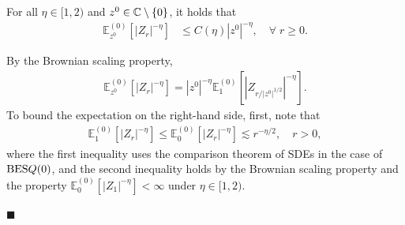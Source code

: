 \documentclass[12pt, twoside]{article}
\numberwithin{figure}{section}
\newcommand{\BES}{{\rm BES}}
\newcommand{\less}{\lesssim}
\newcommand{\1}{\mathds 1}
\newcommand{\E}{{\mathbb E}}
\newcommand{\2}{{\mathbf 1}}
\renewenvironment{proof}[1][\proofname]{\noindent {\bfseries #1.}\;}{\hfill\ensuremath{\blacksquare}\\}
\begin{document}
\begin{lem}\label{lem:Zintbdd}
For all $\eta\in [1,2)$ and $z^0\in \Bbb C\setminus\{0\}$, it holds that 
\begin{align}\label{ZSDE:lim0}
 \E_{z^0}^{(0)}[|Z_r|^{-\eta}]&\leq C(\eta)|z^0|^{-\eta},\quad \forall\;r\geq 0.
\end{align}
\end{lem}
\begin{proof}
By the Brownian scaling property,
\begin{align}
 \E_{z^0}^{(0)}[|Z_r|^{-\eta}]=|z^0|^{-\eta} \E^{(0)}_{1}[|Z_{r/|z^0|^{1/2}}|^{-\eta}].
 \label{ZSDE:lim1}
\end{align}
To bound the expectation on the right-hand side, first, note that 
\begin{align}\label{ZSDE:lim2}
\E^{(0)}_{1}[|Z_r|^{-\eta}]\leq \E^{(0)}_{0}[|Z_r|^{-\eta}]\less r^{-\eta/2},\quad r>0,
\end{align}
where the first inequality uses the comparison theorem of SDEs \cite[2.18 Proposition, p.293]{KS:BM} in the case of $\BES Q(0)$, and the second inequality holds by the Brownian scaling property and the property $\E^{(0)}_0[|Z_1|^{-\eta}]<\infty$ under $\eta\in [1,2)$.


\end{proof}
\end{document}
